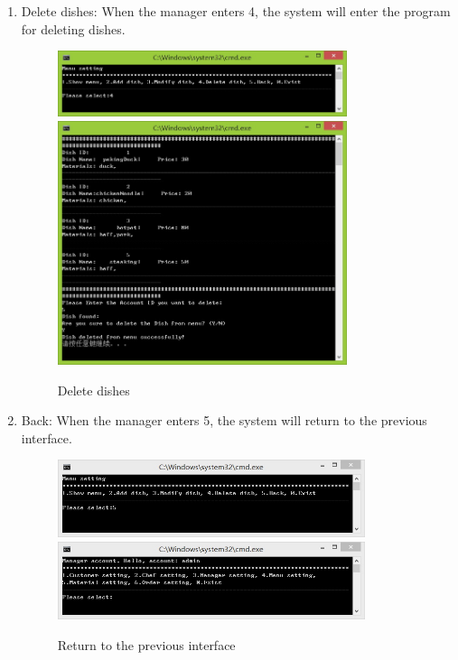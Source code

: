 \documentclass{article}
\begin{document}
\begin{enumerate}
    \item Delete dishes:\newline 
    When the manager enters 4, the system will enter the program for deleting dishes. 
        \begin{figure}[H]
        \centering
        \includegraphics[width=0.8\textwidth]{D/D4a1.jpg}
        \includegraphics[width=0.8\textwidth]{D/D4c1.jpg}
        \caption{Delete dishes}
        \end{figure}
    
    \item Back:\newline 
    When the manager enters 5, the system will return to the previous interface.
        \begin{figure}[H]
        \centering
        \includegraphics[width=0.85\textwidth]{D/D5a.jpg}
        \includegraphics[width=0.85\textwidth]{D/D5b.jpg}
        \caption{Return to the previous interface}
        \end{figure}
    

\end{enumerate}
\end{document}
